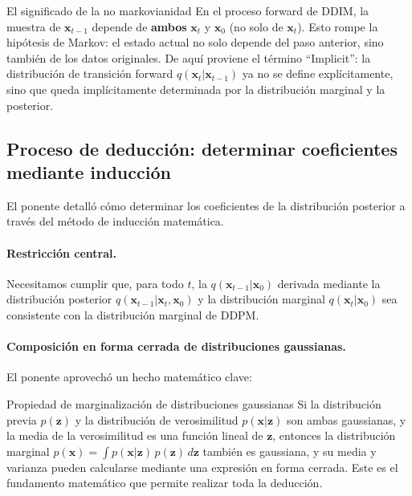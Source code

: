\begin{warningbox}{El significado de la no markovianidad}
En el proceso forward de DDIM, la muestra de $\mathbf{x}_{t-1}$ depende de \textbf{ambos} $\mathbf{x}_t$ y $\mathbf{x}_0$ (no solo de $\mathbf{x}_t$). Esto rompe la hipótesis de Markov: el estado actual no solo depende del paso anterior, sino también de los datos originales. De aquí proviene el término ``Implicit'': la distribución de transición forward $q(\mathbf{x}_t|\mathbf{x}_{t-1})$ ya no se define explícitamente, sino que queda implícitamente determinada por la distribución marginal y la posterior.
\end{warningbox}

\subsection{Proceso de deducción: determinar coeficientes mediante inducción}

El ponente detalló cómo determinar los coeficientes de la distribución posterior a través del método de inducción matemática.

\paragraph{Restricción central.} Necesitamos cumplir que, para todo $t$, la $q(\mathbf{x}_{t-1}|\mathbf{x}_0)$ derivada mediante la distribución posterior $q(\mathbf{x}_{t-1}|\mathbf{x}_t, \mathbf{x}_0)$ y la distribución marginal $q(\mathbf{x}_t|\mathbf{x}_0)$ sea consistente con la distribución marginal de DDPM.

\paragraph{Composición en forma cerrada de distribuciones gaussianas.} El ponente aprovechó un hecho matemático clave:

\begin{knowledgebox}{Propiedad de marginalización de distribuciones gaussianas}
Si la distribución previa $p(\mathbf{z})$ y la distribución de verosimilitud $p(\mathbf{x}|\mathbf{z})$ son ambas gaussianas, y la media de la verosimilitud es una función lineal de $\mathbf{z}$, entonces la distribución marginal $p(\mathbf{x}) = \int p(\mathbf{x}|\mathbf{z})\,p(\mathbf{z})\,d\mathbf{z}$ también es gaussiana, y su media y varianza pueden calcularse mediante una expresión en forma cerrada. Este es el fundamento matemático que permite realizar toda la deducción.
\end{knowledgebox}


